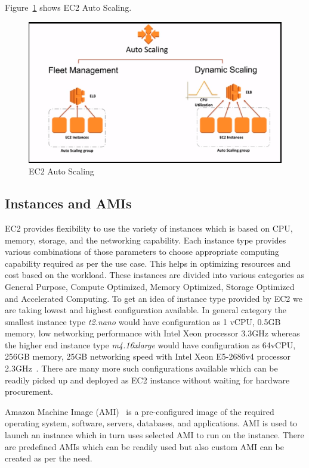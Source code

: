 Figure~\ref{f:ec2-auto-scaling} shows EC2 Auto Scaling.
\begin{figure}[!ht]
  \centering\includegraphics[width=\columnwidth]
	{images/ec2AutoScaling.PNG} \caption{EC2
  Auto
  Scaling~\cite{hid-sp18-402-www-aws-ec2autoscaling}}\label{f:ec2-auto-scaling}
\end{figure}

\subsection{Instances and AMIs}
EC2 provides flexibility to use the variety of instances which is
based on CPU, memory, storage, and the networking capability. Each
instance type provides various combinations of those parameters to
choose appropriate computing capability required as per the use
case. This helps in optimizing resources and cost based on the
workload. These instances are divided into various categories as
General Purpose, Compute Optimized, Memory Optimized, Storage
Optimized and Accelerated Computing. To get an idea of instance type
provided by EC2 we are taking lowest and highest configuration
available. In general category the smallest instance
type \emph{t2.nano} would have configuration as 1 vCPU, 0.5GB memory,
low networking performance with Intel Xeon processor 3.3GHz whereas
the higher end instance type \emph{m4.16xlarge} would have
configuration as 64vCPU, 256GB memory, 25GB networking speed with
Intel Xeon E5-2686v4 processor
2.3GHz~\cite{hid-sp18-402-www-aws-ec2instance}. There are many more
such configurations available which can be readily picked up and
deployed as EC2 instance without waiting for hardware procurement.

Amazon Machine Image (AMI)~\cite{hid-sp18-402-www-aws-ec2instance} is
a pre-configured image of the required operating system, software,
servers, databases, and applications. AMI is used to launch an
instance which in turn uses selected AMI to run on the instance. There
are predefined AMIs which can be readily used but also custom AMI can
be created as per the need.

